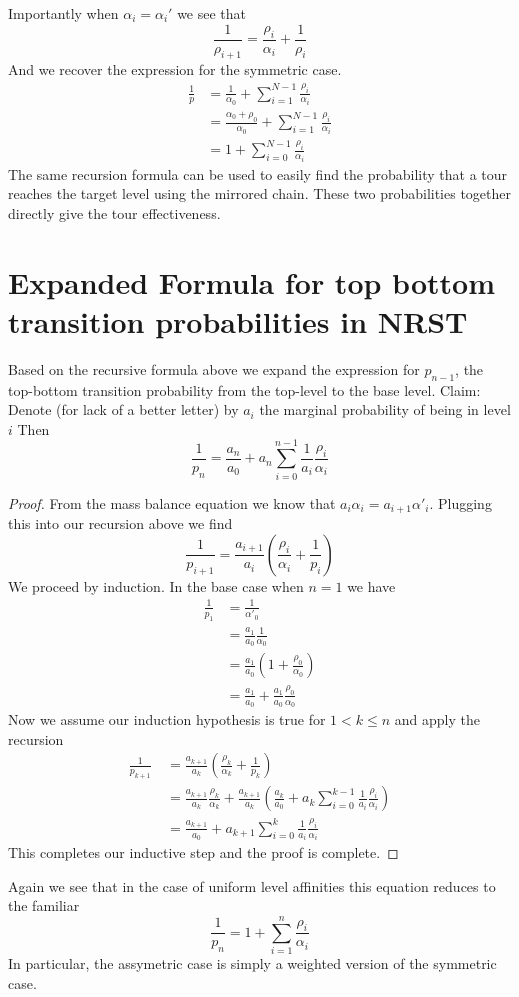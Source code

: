 \documentclass{article}
\begin{document}
Importantly when $\alpha_i=\alpha_i'$ we see that
\[ \frac{1}{\rho_{i+1}} = \frac{\rho_i}{\alpha_i}+\frac{1}{\rho_i} \]
And we recover the expression for the symmetric case. 
\begin{align*}
    \frac{1}{p} &= \frac{1}{\alpha_0} + \sum_{i=1}^{N-1} \frac{\rho_i}{\alpha_i} \\
    &= \frac{\alpha_0+\rho_0}{\alpha_0} +  \sum_{i=1}^{N-1} \frac{\rho_i}{\alpha_i} \\
    &= 1+ \sum_{i=0}^{N-1} \frac{\rho_i}{\alpha_i}
\end{align*} 
The same recursion formula can be used to easily find the probability that a
tour reaches the target level using the mirrored chain. These two probabilities
together directly give the tour effectiveness.

\section{Expanded Formula for top bottom transition probabilities in NRST}
Based on the recursive formula above we expand the expression for $p_{n-1}$, the
top-bottom transition probability from the top-level to the base level. Claim:
Denote (for lack of a better letter) by $a_i$ the marginal probability of being
in level $i$ Then
\[ \frac{1}{p_{n}} 
= \frac{a_n}{a_0} + a_{n}\sum_{i=0}^{n-1} \frac{1}{a_i}\frac{\rho_i}{\alpha_i} \]

\begin{proof}
    From the mass balance equation we know that $a_i \alpha_i = a_{i+1}\alpha'_i$.
    Plugging this into our recursion above we find 
    \[ \frac{1}{p_{i+1}} 
    = \frac{a_{i+1}}{a_i} \left(\frac{\rho_i}{\alpha_i} + \frac{1}{p_i}\right)\]
    We proceed by induction. In the base case when $n=1$ we have 
    \begin{align*}
        \frac{1}{p_1} &= \frac{1}{\alpha'_0} \\
        &= \frac{a_1}{a_0}\frac{1}{\alpha_0} \\
        &= \frac{a_1}{a_0}\left(1+\frac{\rho_0}{\alpha_0}\right) \\
        &= \frac{a_1}{a_0} + \frac{a_1}{a_0}\frac{\rho_0}{\alpha_0}
    \end{align*}
    Now we assume our induction hypothesis is true for $1 < k \leq n$ and apply
    the recursion
    \begin{align*}
    \frac{1}{p_{k+1}}\
    &= \frac{a_{k+1}}{a_k}\left(\frac{\rho_k}{\alpha_k}+\frac{1}{p_k}\right) \\
    &= \frac{a_{k+1}}{a_k}\frac{\rho_k}{\alpha_k} + 
    \frac{a_{k+1}}{a_k}
    \left(\frac{a_k}{a_0}+a_k\sum_{i=0}^{k-1}\frac{1}{a_i}\frac{\rho_i}{\alpha_i}\right) \\
    &= \frac{a_{k+1}}{a_0} + a_{k+1}\sum_{i=0}^k \frac{1}{a_i}\frac{\rho_i}{\alpha_i}
    \end{align*}
    This completes our inductive step and the proof is complete.
\end{proof}
Again we see that in the case of uniform level affinities this equation reduces
to the familiar \[ \frac{1}{p_n} = 1+\sum_{i=1}^n \frac{\rho_i}{\alpha_i}\] 
In particular, the assymetric case is simply a weighted version of the symmetric
case.
\end{document}

